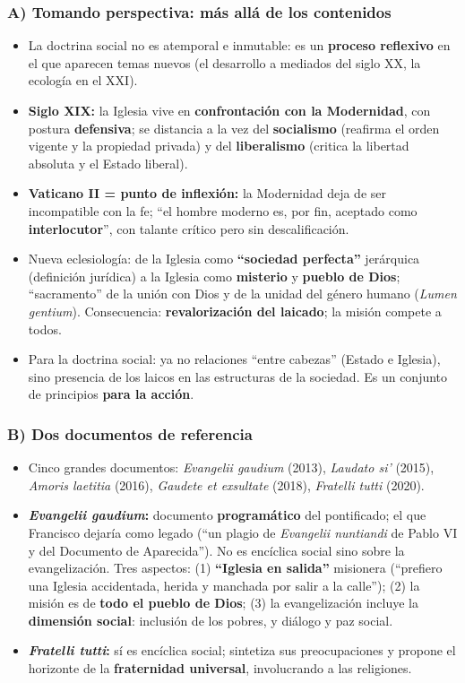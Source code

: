 \documentclass[10pt,a4paper]{article}
\begin{document}
\subsubsection{A) Tomando perspectiva: más allá de los contenidos}
\begin{itemize}
\item La doctrina social no es atemporal e inmutable: es un \textbf{proceso reflexivo} en el que aparecen temas nuevos (el desarrollo a mediados del siglo XX, la ecología en el XXI).
\item \textbf{Siglo XIX:} la Iglesia vive en \textbf{confrontación con la Modernidad}, con postura \textbf{defensiva}; se distancia a la vez del \textbf{socialismo} (reafirma el orden vigente y la propiedad privada) y del \textbf{liberalismo} (critica la libertad absoluta y el Estado liberal).
\item \textbf{Vaticano II = punto de inflexión:} la Modernidad deja de ser incompatible con la fe; ``el hombre moderno es, por fin, aceptado como \textbf{interlocutor}'', con talante crítico pero sin descalificación.
\item Nueva eclesiología: de la Iglesia como \textbf{``sociedad perfecta''} jerárquica (definición jurídica) a la Iglesia como \textbf{misterio} y \textbf{pueblo de Dios}; ``sacramento'' de la unión con Dios y de la unidad del género humano (\textit{Lumen gentium}). Consecuencia: \textbf{revalorización del laicado}; la misión compete a todos.
\item Para la doctrina social: ya no relaciones ``entre cabezas'' (Estado e Iglesia), sino presencia de los laicos en las estructuras de la sociedad. Es un conjunto de principios \textbf{para la acción}.
\end{itemize}

\subsubsection{B) Dos documentos de referencia}
\begin{itemize}
\item Cinco grandes documentos: \textit{Evangelii gaudium} (2013), \textit{Laudato si'} (2015), \textit{Amoris laetitia} (2016), \textit{Gaudete et exsultate} (2018), \textit{Fratelli tutti} (2020).
\item \textbf{\textit{Evangelii gaudium}:} documento \textbf{programático} del pontificado; el que Francisco dejaría como legado (``un plagio de \textit{Evangelii nuntiandi} de Pablo VI y del Documento de Aparecida''). No es encíclica social sino sobre la evangelización. Tres aspectos: (1) \textbf{``Iglesia en salida''} misionera (``prefiero una Iglesia accidentada, herida y manchada por salir a la calle''); (2) la misión es de \textbf{todo el pueblo de Dios}; (3) la evangelización incluye la \textbf{dimensión social}: inclusión de los pobres, y diálogo y paz social.
\item \textbf{\textit{Fratelli tutti}:} sí es encíclica social; sintetiza sus preocupaciones y propone el horizonte de la \textbf{fraternidad universal}, involucrando a las religiones.
\end{itemize}
\end{document}
